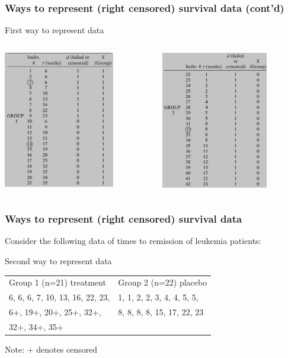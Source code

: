 \documentclass{beamer}
\theoremstyle{definition}
\begin{document}
\begin{frame}
\frametitle{Ways to represent (right censored) survival data (cont'd)}
\begin{block}{First way to represent data }
\begin{columns}
    \begin{column}{0.48\textwidth}
        \includegraphics[width =\textwidth, height=6cm]{Ch1-leuk_dat_a.JPG}
    \end{column}
    \hspace{-10pt}
    \begin{column}{0.48\textwidth}
         \includegraphics[width =\textwidth, height=6cm]{Ch1-leuk_dat_b.JPG}
    \end{column}
\end{columns}
\end{block}
\end{frame}

\begin{frame}
\frametitle{Ways to represent (right censored) survival data}
Consider the following data of times to remission of leukemia patients:
\begin{block}{Second way to represent data }
\begin{table}
\begin{center}
\begin{tabular}{l l}
Group 1 (n=21) treatment & Group 2 (n=22) placebo \\
 6, 6, 6, 7, 10, 13, 16, 22, 23, & 1, 1, 2, 2, 3, 4, 4, 5, 5,  \\
 6+, 19+, 20+, 25+, 32+,& 8, 8, 8, 8, 15, 17, 22, 23 \\
  32+, 34+, 35+ &
\end{tabular}
\end{center}
\end{table}
Note: + denotes censored
\end{block}
\end{frame}
\end{document}
